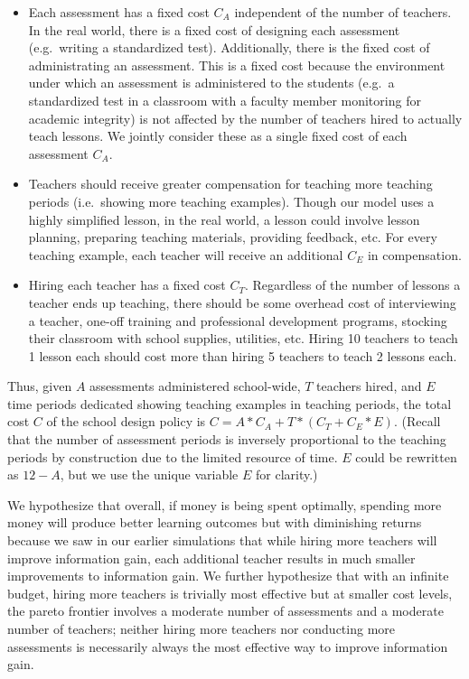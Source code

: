 \documentclass[10pt, letterpaper]{apa6}
\begin{document}
\begin{itemize}
\item
  Each assessment has a fixed cost \(C_A\) independent of the number of
  teachers. In the real world, there is a fixed cost of designing each
  assessment (e.g.~writing a standardized test). Additionally, there is
  the fixed cost of administrating an assessment. This is a fixed cost
  because the environment under which an assessment is administered to
  the students (e.g.~a standardized test in a classroom with a faculty
  member monitoring for academic integrity) is not affected by the
  number of teachers hired to actually teach lessons. We jointly
  consider these as a single fixed cost of each assessment \(C_A\).
\item
  Teachers should receive greater compensation for teaching more
  teaching periods (i.e.~showing more teaching examples). Though our
  model uses a highly simplified lesson, in the real world, a lesson
  could involve lesson planning, preparing teaching materials, providing
  feedback, etc. For every teaching example, each teacher will receive
  an additional \(C_E\) in compensation.
\item
  Hiring each teacher has a fixed cost \(C_T\). Regardless of the number
  of lessons a teacher ends up teaching, there should be some overhead
  cost of interviewing a teacher, one-off training and professional
  development programs, stocking their classroom with school supplies,
  utilities, etc. Hiring 10 teachers to teach 1 lesson each should cost
  more than hiring 5 teachers to teach 2 lessons each.
\end{itemize}

Thus, given \(A\) assessments administered school-wide, \(T\) teachers
hired, and \(E\) time periods dedicated showing teaching examples in
teaching periods, the total cost \(C\) of the school design policy is
\(C = A * C_A + T * (C_T + C_E * E)\). (Recall that the number of
assessment periods is inversely proportional to the teaching periods by
construction due to the limited resource of time. \(E\) could be
rewritten as \(12 - A\), but we use the unique variable \(E\) for
clarity.)

We hypothesize that overall, if money is being spent optimally, spending
more money will produce better learning outcomes but with diminishing
returns because we saw in our earlier simulations that while hiring more
teachers will improve information gain, each additional teacher results
in much smaller improvements to information gain. We further hypothesize
that with an infinite budget, hiring more teachers is trivially most
effective but at smaller cost levels, the pareto frontier involves a
moderate number of assessments and a moderate number of teachers;
neither hiring more teachers nor conducting more assessments is
necessarily always the most effective way to improve information gain.
\end{document}

